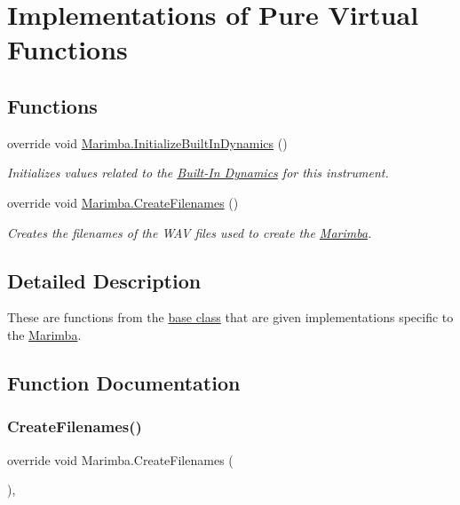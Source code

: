 \hypertarget{group___mar_virt}{}\section{Implementations of Pure Virtual Functions}
\label{group___mar_virt}
\subsection*{Functions}
\begin{DoxyCompactItemize}
\item 
override void \hyperlink{group___mar_virt_ga293d829cb8571c21452c23e90968b2d8}{Marimba.\+Initialize\+Built\+In\+Dynamics} ()
\begin{DoxyCompactList}\small\item\em Initializes values related to the \hyperlink{group___audio_DefBID}{Built-\/\+In Dynamics} for this instrument. \end{DoxyCompactList}\item 
override void \hyperlink{group___mar_virt_gae57d9737fd07708dc7e13e74ee777878}{Marimba.\+Create\+Filenames} ()
\begin{DoxyCompactList}\small\item\em Creates the filenames of the W\+AV files used to create the \hyperlink{class_marimba}{Marimba}. \end{DoxyCompactList}\end{DoxyCompactItemize}


\subsection{Detailed Description}
These are functions from the \hyperlink{}{base class} that are given implementations specific to the \hyperlink{class_marimba}{Marimba}. 

\subsection{Function Documentation}
\mbox{\label{group___mar_virt_gae57d9737fd07708dc7e13e74ee777878}} 
\subsubsection{\texorpdfstring{Create\+Filenames()}{CreateFilenames()}}
{\footnotesize\ttfamily override void Marimba.\+Create\+Filenames (\begin{DoxyParamCaption}{ }\end{DoxyParamCaption})\hspace{0.3cm}{\ttfamily [protected]}, {\ttfamily [virtual]}}



